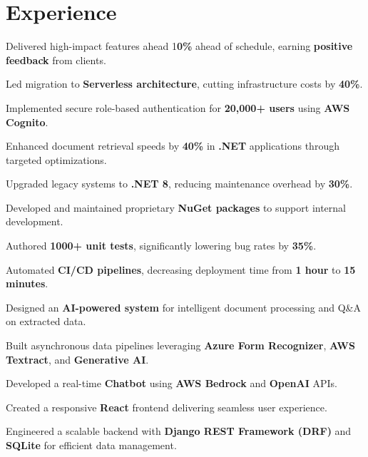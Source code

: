 \documentclass[]{deedy-resume-reversed}
\begin{document}
\begin{minipage}[t]{0.60\textwidth}


\section{Experience}

\vspace{\topsep}
\begin{tightemize}
\item Delivered high-impact features ahead 1\textbf{0\%} ahead of schedule, earning \textbf{positive feedback} from clients.
\item Led migration to \textbf{Serverless architecture}, cutting infrastructure costs by \textbf{40\%}.
\item Implemented secure role-based authentication for \textbf{20,000+ users} using \textbf{AWS Cognito}.
\item Enhanced document retrieval speeds by \textbf{40\%} in \textbf{.NET} applications through targeted optimizations.
\item Upgraded legacy systems to \textbf{.NET 8}, reducing maintenance overhead by \textbf{30\%}.
\item Developed and maintained proprietary \textbf{NuGet packages} to support internal development.
\item Authored \textbf{1000+ unit tests}, significantly lowering bug rates by \textbf{35\%}.
\item Automated \textbf{CI/CD pipelines}, decreasing deployment time from \textbf{1 hour} to \textbf{15 minutes}.
\end{tightemize}
\sectionsep

\begin{tightemize}
\item Designed an \textbf{AI-powered system} for intelligent document processing and Q\&A on extracted data.
\item Built asynchronous data pipelines leveraging \textbf{Azure Form Recognizer}, \textbf{AWS Textract}, and \textbf{Generative AI}.
\item Developed a real-time \textbf{Chatbot} using \textbf{AWS Bedrock} and \textbf{OpenAI} APIs.
\item Created a responsive \textbf{React} frontend delivering seamless user experience.
\item Engineered a scalable backend with \textbf{Django REST Framework (DRF)} and \textbf{SQLite} for efficient data management.
\end{tightemize}
\sectionsep


\end{minipage}
\end{document}

